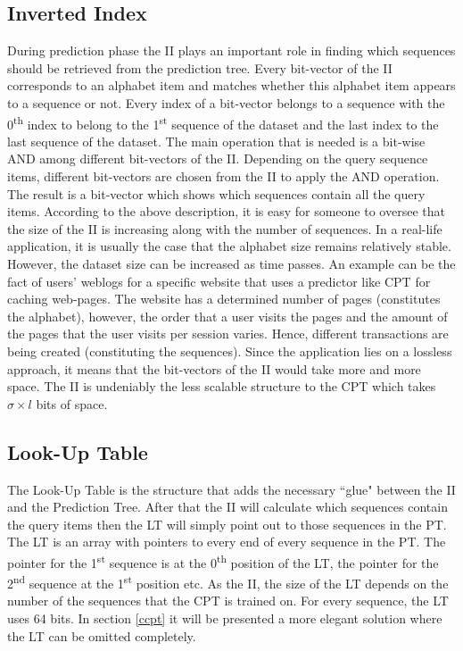 \subsection{Inverted Index}
During prediction phase the II plays an important role in finding which sequences should be retrieved from the prediction tree. Every bit-vector of the II corresponds to an alphabet item and matches whether this alphabet item appears to a sequence or not. Every index of a bit-vector belongs to a sequence with the 0\textsuperscript{th} index to belong to the 1\textsuperscript{st} sequence of the dataset and the last index to the last sequence of the dataset. The main operation that is needed is a bit-wise AND among different bit-vectors of the II. Depending on the query sequence items, different bit-vectors are chosen from the II to apply the AND operation. The result is a bit-vector which shows which sequences contain all the query items. According to the above description, it is easy for someone to oversee that the size of the II is increasing along with the number of sequences. In a real-life application, it is usually the case that the alphabet size remains relatively stable. However, the dataset size can be increased as time passes. An example can be the fact of users' weblogs for a specific website that uses a predictor like CPT for caching web-pages. The website has a determined number of pages (constitutes the alphabet), however, the order that a user visits the pages and the amount of the pages that the user visits per session varies. Hence, different transactions are being created (constituting the sequences). Since the application lies on a lossless approach, it means that the bit-vectors of the II would take more and more space. The II is undeniably the less scalable structure to the CPT which takes \(\sigma \times l\) bits of space.
\subsection{Look-Up Table}
The Look-Up Table is the structure that adds the necessary ``glue" between the II and the Prediction Tree. After that the II will calculate which sequences contain the query items then the LT will simply point out to those sequences in the PT. The LT is an array with pointers to every end of every sequence in the PT. The pointer for the 1\textsuperscript{st} sequence is at the 0\textsuperscript{th} position of the LT, the pointer for the 2\textsuperscript{nd} sequence at the 1\textsuperscript{st} position etc. As the II, the size of the LT depends on the number of the sequences that the CPT is trained on. For every sequence, the LT uses 64 bits. In section \ref{ccpt} it will be presented a more elegant solution where the LT can be omitted completely.
